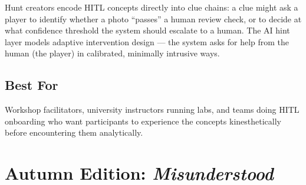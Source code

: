 \documentclass[12pt, a4paper]{article}
\begin{document}
\begin{tcolorbox}[editionbox=springgreen, title=Spring Edition \textbullet\ Interactive Scavenger-Hunt Platform]
Hunt creators encode HITL concepts directly into clue chains: a clue might ask a player to identify whether a photo ``passes'' a human review check, or to decide at what confidence threshold the system should escalate to a human. The AI hint layer models adaptive intervention design — the system asks for help from the human (the player) in calibrated, minimally intrusive ways.

\subsection*{\color{charcoal} Best For}

Workshop facilitators, university instructors running labs, and teams doing HITL onboarding who want participants to experience the concepts kinesthetically before encountering them analytically.

\end{tcolorbox}

\newpage

\section{Autumn Edition: \textit{Misunderstood}}
\end{document}
